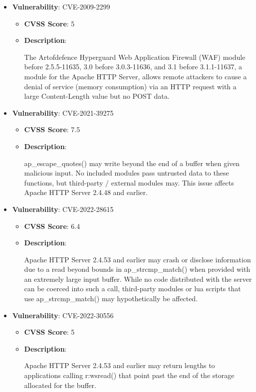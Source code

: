 \documentclass{article}
\begin{document}
\begin{itemize}
        \item \textbf{Vulnerability}: CVE-2009-2299
        \begin{itemize}
            \item \textbf{CVSS Score}:  5 
            \item \textbf{Description}:
            \parbox[t]{0.9\linewidth}{
                \ttfamily The Artofdefence Hyperguard Web Application Firewall (WAF) module before 2.5.5-11635, 3.0 before 3.0.3-11636, and 3.1 before 3.1.1-11637, a module for the Apache HTTP Server, allows remote attackers to cause a denial of service (memory consumption) via an HTTP request with a large Content-Length value but no POST data.
            }
        \end{itemize}
    
        \item \textbf{Vulnerability}: CVE-2021-39275
        \begin{itemize}
            \item \textbf{CVSS Score}:  7.5 
            \item \textbf{Description}:
            \parbox[t]{0.9\linewidth}{
                \ttfamily ap\_escape\_quotes() may write beyond the end of a buffer when given malicious input. No included modules pass untrusted data to these functions, but third-party / external modules may. This issue affects Apache HTTP Server 2.4.48 and earlier.
            }
        \end{itemize}
    
        \item \textbf{Vulnerability}: CVE-2022-28615
        \begin{itemize}
            \item \textbf{CVSS Score}:  6.4 
            \item \textbf{Description}:
            \parbox[t]{0.9\linewidth}{
                \ttfamily Apache HTTP Server 2.4.53 and earlier may crash or disclose information due to a read beyond bounds in ap\_strcmp\_match() when provided with an extremely large input buffer. While no code distributed with the server can be coerced into such a call, third-party modules or lua scripts that use ap\_strcmp\_match() may hypothetically be affected.
            }
        \end{itemize}
    
        \item \textbf{Vulnerability}: CVE-2022-30556
        \begin{itemize}
            \item \textbf{CVSS Score}:  5 
            \item \textbf{Description}:
            \parbox[t]{0.9\linewidth}{
                \ttfamily Apache HTTP Server 2.4.53 and earlier may return lengths to applications calling r:wsread() that point past the end of the storage allocated for the buffer.
            }
        \end{itemize}
    

\end{itemize}
\end{document}
